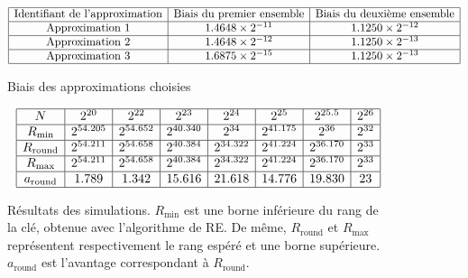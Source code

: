 \documentclass{scrartcl}
\begin{document}
\begin{figure}
	\[
		\begin{array}{|c|c|c|}
			\hline
			\text{Identifiant de l'approximation} & \text{Biais du premier ensemble} & \text{Biais du deuxième ensemble}\\
			\hline
			\text{Approximation 1} & 1.4648 \times 2^{-11} & 1.1250\times 2^{-12}\\
			\hline
			\text{Approximation 2} & 1.4648 \times 2^{-12} & 1.1250\times 2^{-13} \\
			\hline
			\text{Approximation 3} & 1.6875 \times 2^{-15} & 1.1250\times 2^{-13}\\
			\hline
		\end{array}
	\]
	\caption{Biais des approximations choisies}
	\label{bias}
\end{figure}



\begin{figure}
\[
	\begin{array}{|c|c|c|c|c|c|c|c|}
		\hline
		N & 2^{20} & 2^{22} & 2^{23} & 2^{24} & 2^{25} & 2^{25.5} & 2^{26}\\
		\hline
		R_{\text{min}} & 2^{54.205} & 2^{54.652} & 2^{40.340} & 2^{34} & 2^{41.175} & 2^{36} & 2^{32}\\
		\hline
		R_{\text{round}} & 2^{54.211} & 2^{54.658} & 2^{40.384} & 2^{34.322} & 2^{41.224} & 2^{36.170} & 2^{33}\\
		\hline
		R_{\text{max}} & 2^{54.211} & 2^{54.658} & 2^{40.384} & 2^{34.322} & 2^{41.224} & 2^{36.170} & 2^{33}\\
		\hline
		a_{\text{round}} & 1.789 & 1.342 & 15.616 & 21.618 & 14.776 & 19.830 & 23\\
		\hline
	\end{array}
\]

	\caption{Résultats des simulations. $R_{\text{min}}$ est une borne inférieure du rang de la clé,
	obtenue avec l'algorithme de RE. De même, $R_{\text{round}}$ et $R_{\text{max}}$ représentent
	respectivement le rang espéré et une borne supérieure. $a_{\text{round}}$ est l'avantage correspondant
	à $R_{\text{round}}$.}
	\label{result}
\end{figure}
\end{document}
